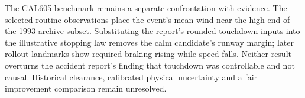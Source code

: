 \documentclass[11pt,a4paper]{article}
\begin{document}
The CAL605 benchmark remains a separate confrontation with evidence. The selected routine observations place the event's mean wind near the high end of the 1993 archive subset. Substituting the report's rounded touchdown inputs into the illustrative stopping law removes the calm candidate's runway margin; later rollout landmarks show required braking rising while speed falls. Neither result overturns the accident report's finding that touchdown was controllable and not causal. Historical clearance, calibrated physical uncertainty and a fair improvement comparison remain unresolved.

\clearpage
\tableofcontents
\clearpage

\clearpage

\clearpage

\end{document}
